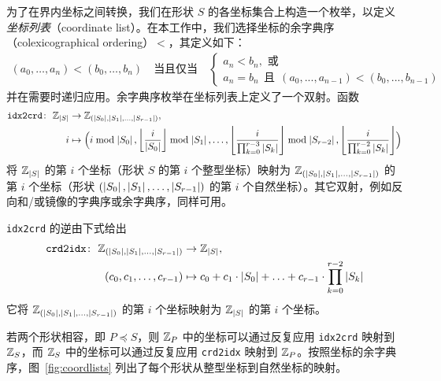 为了在界内坐标之间转换，我们在形状 $S$ 的各坐标集合上构造一个枚举，以定义{\em 坐标列表}（coordinate list）。在本工作中，我们选择坐标的余字典序（colexicographical ordering）$<$，其定义如下：
\begin{align*}
(a_0, \ldots, a_n) < (b_0, \ldots, b_n)
\quad \text{当且仅当} \quad
\begin{cases}
    a_n < b_n, \text{ 或} \\
    a_n = b_n \ \ \text{且} \ \ (a_0,...,a_{n-1}) < (b_0,...,b_{n-1})
\end{cases}
\end{align*}
并在需要时递归应用。余字典序枚举在坐标列表上定义了一个双射。函数
\begin{align}
\texttt{idx2crd} \colon \ \mathbb{Z}_{\left| {S} \right|} &\to \mathbb{Z}_{(\left| {S_0} \right|, \left| {S_1} \right|, \ldots, \left| {S_{r-1}} \right|)}, \nonumber \\
i &\mapsto \Bigl(i \bmod \left| {S_0} \right|, \left\lfloor {\frac{i}{\left| {S_0} \right|}} \right\rfloor \bmod \left| {S_1} \right|, \ldots, \left\lfloor {\frac{i}{\prod_{k=0}^{r-3} \left| {S_k} \right|}} \right\rfloor \bmod \left| {S_{r-2}} \right|, \left\lfloor {\frac{i}{\prod_{k=0}^{r-2} \left| {S_k} \right|}} \right\rfloor \Bigr)
\label{eqn:idx2crd}
\end{align}
将 $\mathbb{Z}_{\left| {S} \right|}$ 的第 $i$ 个坐标（形状 $S$ 的第 $i$ 个整型坐标）映射为 $\mathbb{Z}_{(\left| {S_0} \right|, \left| {S_1} \right|, \ldots, \left| {S_{r-1}} \right|)}$ 的第 $i$ 个坐标（形状 $(\left| {S_0} \right|, \left| {S_1} \right|, \ldots, \left| {S_{r-1}} \right|)$ 的第 $i$ 个自然坐标）。其它双射，例如反向和/或镜像的字典序或余字典序，同样可用。

\texttt{idx2crd} 的逆由下式给出
\begin{align}
\texttt{crd2idx} \colon \ \mathbb{Z}_{(\left| {S_0} \right|, \left| {S_1} \right|, \ldots, \left| {S_{r-1}} \right|)} &\to \mathbb{Z}_{\left| {S} \right|}, \nonumber \\
(c_0, c_1, \ldots, c_{r-1}) &\mapsto c_0 + c_1 \cdot \left| {S_0} \right| + \ldots + c_{r-1} \cdot \prod_{k=0}^{r-2} \left| {S_k} \right|
\label{eqn:crd2idx}
\end{align}
它将 $\mathbb{Z}_{(\left| {S_0} \right|, \left| {S_1} \right|, \ldots, \left| {S_{r-1}} \right|)}$ 的第 $i$ 个坐标映射为 $\mathbb{Z}_{\left| {S} \right|}$ 的第 $i$ 个坐标。

若两个形状相容，即 $P \preceq S$，则 $\mathbb{Z}_P$ 中的坐标可以通过反复应用 \texttt{idx2crd} 映射到 $\mathbb{Z}_S$，而 $\mathbb{Z}_S$ 中的坐标可以通过反复应用 \texttt{crd2idx} 映射到 $\mathbb{Z}_P$。按照坐标的余字典序，图~\ref{fig:coordlists} 列出了每个形状从整型坐标到自然坐标的映射。

